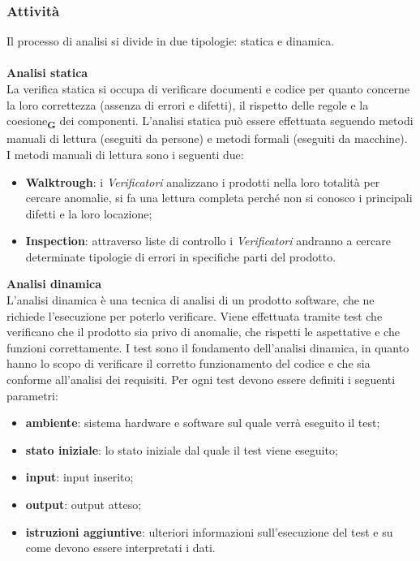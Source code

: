         \subsubsection{Attività}
            Il processo di analisi si divide in due tipologie: statica e dinamica.\\
            \\
            \textbf{Analisi statica}\\
            La verifica statica si occupa di verificare documenti e codice per quanto concerne la loro correttezza (assenza di errori e difetti), il rispetto delle regole e la coesione\textsubscript{\textbf{G}} dei componenti. L'analisi statica può essere effettuata seguendo metodi manuali di lettura (eseguiti da persone) e metodi formali (eseguiti da macchine). I metodi manuali di lettura sono i seguenti due:
            \begin{itemize}
                \item \textbf{Walktrough}: i \textit{Verificatori} analizzano i prodotti nella loro totalità per cercare anomalie, si fa una lettura completa perché non si conosco i principali difetti e la loro locazione;
                \item \textbf{Inspection}: attraverso liste di controllo i \textit{Verificatori} andranno a cercare determinate tipologie di errori in specifiche parti del prodotto. 
            \end{itemize}
            \textbf{Analisi dinamica}\\
            L'analisi dinamica è una tecnica di analisi di un prodotto software, che ne richiede l'esecuzione per poterlo verificare. Viene effettuata tramite test che verificano che il prodotto sia privo di anomalie, che rispetti le aspettative e che funzioni correttamente.
            I test sono il fondamento dell'analisi dinamica, in quanto hanno lo scopo di verificare il corretto funzionamento del codice e che sia conforme all'analisi dei requisiti.
            Per ogni test devono essere definiti i seguenti parametri:
            \begin{itemize}
                \item \textbf{ambiente}: sistema hardware e software sul quale verrà eseguito il test;
                \item \textbf{stato iniziale}: lo stato iniziale dal quale il test viene eseguito;
                \item \textbf{input}: input inserito;
                \item \textbf{output}: output atteso;
                \item \textbf{istruzioni aggiuntive}: ulteriori informazioni sull'esecuzione del test e su come devono essere interpretati i dati.
            \end{itemize}
